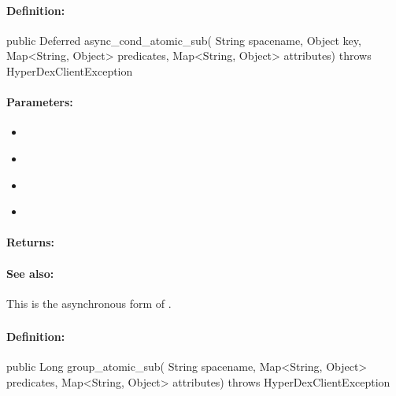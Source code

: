 \paragraph{Definition:}
\begin{javacode}
public Deferred async_cond_atomic_sub(
        String spacename,
        Object key,
        Map<String, Object> predicates,
        Map<String, Object> attributes) throws HyperDexClientException
\end{javacode}

\paragraph{Parameters:}
\begin{itemize}[noitemsep]
\item {}\\

\item {}\\

\item {}\\

\item {}\\

\end{itemize}

\paragraph{Returns:}


\paragraph{See also:}  This is the asynchronous form of .

\pagebreak
\subsubsection{}
\label{api:java:group_atomic_sub}


\paragraph{Definition:}
\begin{javacode}
public Long group_atomic_sub(
        String spacename,
        Map<String, Object> predicates,
        Map<String, Object> attributes) throws HyperDexClientException
\end{javacode}

